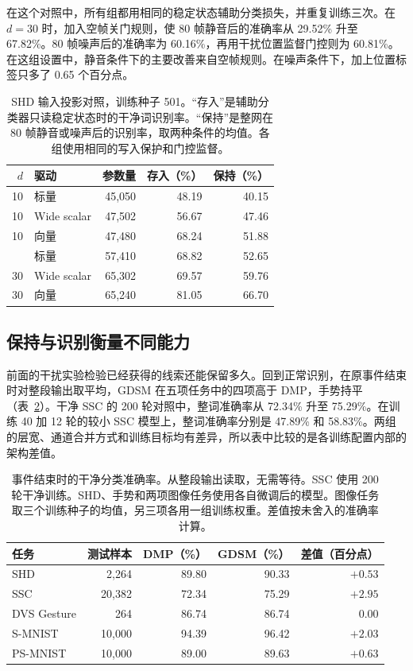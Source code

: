 \documentclass[11pt]{article}
\newcommand{\pid}[1]{\ifstrequal{#1}{摘要}{}{\leavevmode\llap{\scriptsize\sffamily #1\hspace{.65em}}}\ignorespaces}
\begin{document}
\pid{4.2-P4} 在这个对照中，所有组都用相同的稳定状态辅助分类损失，并重复训练三次。在 $d=30$ 时，加入空帧关门规则，使 80 帧静音后的准确率从 29.52\% 升至 67.82\%。80 帧噪声后的准确率为 60.16\%，再用干扰位置监督门控则为 60.81\%。在这组设置中，静音条件下的主要改善来自空帧规则。在噪声条件下，加上位置标签只多了 0.65 个百分点。

\begin{table}[htbp]
\centering\small
\caption{SHD 输入投影对照，训练种子 501。“存入”是辅助分类器只读稳定状态时的干净词识别率。“保持”是整网在 80 帧静音或噪声后的识别率，取两种条件的均值。各组使用相同的写入保护和门控监督。}
\label{tab:capacity}
\begin{lrbox}{\tablebox}\begin{tabular}{rlrrr}
\toprule $d$ & 驱动 & 参数量 & 存入（\%） & 保持（\%）\\\midrule
10 & 标量 & 45,050 & 48.19 & 40.15\\
10 & Wide scalar & 47,502 & 56.67 & 47.46\\
10 & 向量 & 47,480 & 68.24 & 51.88\\\addlinespace
30 & 标量 & 57,410 & 68.82 & 52.65\\
30 & Wide scalar & 65,302 & 69.57 & 59.76\\
30 & 向量 & 65,240 & 81.05 & 66.70\\
\bottomrule
\end{tabular}\end{lrbox}
\ifdim\wd\tablebox>\linewidth\resizebox{\linewidth}{!}{\usebox{\tablebox}}\else\usebox{\tablebox}\fi
\end{table}

\subsection{保持与识别衡量不同能力}
\pid{4.3-P1} 前面的干扰实验检验已经获得的线索还能保留多久。回到正常识别，在原事件结束时对整段输出取平均，GDSM 在五项任务中的四项高于 DMP，手势持平（表~\ref{tab:recognition}）。干净 SSC 的 200 轮对照中，整词准确率从 72.34\% 升至 75.29\%。在训练 40 加 12 轮的较小 SSC 模型上，整词准确率分别是 47.89\% 和 58.83\%。两组的层宽、通道合并方式和训练目标均有差异，所以表中比较的是各训练配置内部的架构差值。

\begin{table}[tbp]
\centering\small
\caption{事件结束时的干净分类准确率。从整段输出读取，无需等待。SSC 使用 200 轮干净训练。SHD、手势和两项图像任务使用各自微调后的模型。图像任务取三个训练种子的均值，另三项各用一组训练权重。差值按未舍入的准确率计算。}
\label{tab:recognition}
\begin{tabular}{lrrrr}
\toprule
任务 & 测试样本 & DMP（\%） & GDSM（\%） & 差值（百分点）\\\midrule
SHD & 2,264 & 89.80 & 90.33 & $+0.53$\\
SSC & 20,382 & 72.34 & 75.29 & $+2.95$\\
DVS Gesture & 264 & 86.74 & 86.74 & $0.00$\\
S-MNIST & 10,000 & 94.39 & 96.42 & $+2.03$\\
PS-MNIST & 10,000 & 89.00 & 89.63 & $+0.63$\\
\bottomrule
\end{tabular}
\end{table}
\end{document}

